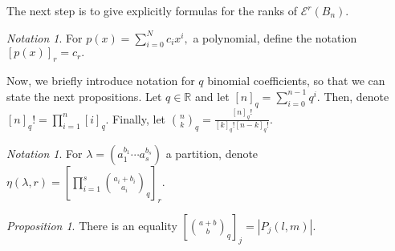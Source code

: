 \documentclass[10 pt]{amsart}
\theoremstyle{plain}
\theoremstyle{definition}
\theoremstyle{remark}
\numberwithin{equation}{section}
\newtheorem{prop}[thm]{Proposition}
\theoremstyle{remark}
\newtheorem{note}[thm]{Notation}
\newcommand\BR{{\mathbb R}}
\begin{document}
The next step is to give explicitly formulas for the ranks of $\mathcal E^r(B_n).$

\begin{note}
For $p(x) = \sum_{i=0}^N c_ix^i,$ a polynomial, define the notation $[p(x)]_r = c_r.$
\end{note}

Now, we briefly introduce notation for $q$ binomial coefficients, so that we can state the next propositions. Let $q \in \BR$ and let $[n]_q = \sum_{i=0}^{n-1} q^i.$ Then, denote $[n]_q! = \prod_{i=1}^n [i]_q.$ Finally, let $\binom n k_q = \frac{[n]_q!}{[k]_q![n-k]_q!}.$

\begin{note}
For $\lambda = (a_1^{b_1} \cdots a_s^{b_s})$ a partition, denote $\eta(\lambda,r) = \left[\prod_{i=1}^s \binom{a_i+b_i}{a_i}_q\right]_r.$
\end{note}

\begin{prop}
\cite[Proposition 1.3.19]{enumerative_comb}
\label{prop:counting_box_partitions}
There is an equality $[\binom {a+b} b_q]_j = |P_j(l,m)|.$
\end{prop}
\end{document}
